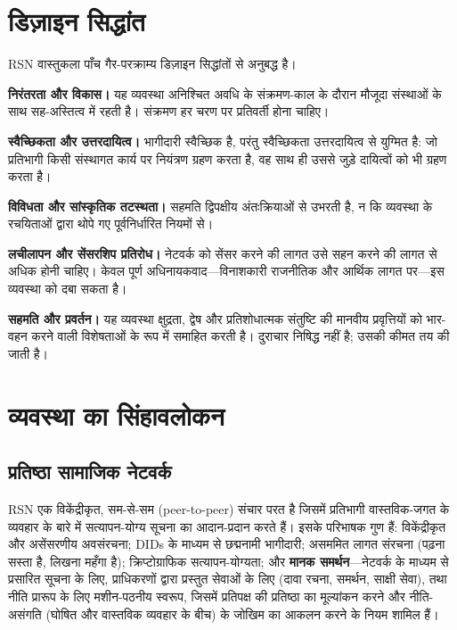 \documentclass[11pt,a4paper,twocolumn]{article}
\begin{document}
\section{डिज़ाइन सिद्धांत}

RSN वास्तुकला पाँच गैर-परक्राम्य डिज़ाइन सिद्धांतों से अनुबद्ध है।

\textbf{निरंतरता और विकास।} यह व्यवस्था अनिश्चित अवधि के संक्रमण-काल के दौरान मौजूदा संस्थाओं के साथ सह-अस्तित्व में रहती है। संक्रमण हर चरण पर प्रतिवर्ती होना चाहिए।

\textbf{स्वैच्छिकता और उत्तरदायित्व।} भागीदारी स्वैच्छिक है, परंतु स्वैच्छिकता उत्तरदायित्व से युग्मित है: जो प्रतिभागी किसी संस्थागत कार्य पर नियंत्रण ग्रहण करता है, वह साथ ही उससे जुड़े दायित्वों को भी ग्रहण करता है।

\textbf{विविधता और सांस्कृतिक तटस्थता।} सहमति द्विपक्षीय अंतःक्रियाओं से उभरती है, न कि व्यवस्था के रचयिताओं द्वारा थोपे गए पूर्वनिर्धारित नियमों से।

\textbf{लचीलापन और सेंसरशिप प्रतिरोध।} नेटवर्क को सेंसर करने की लागत उसे सहन करने की लागत से अधिक होनी चाहिए। केवल पूर्ण अधिनायकवाद---विनाशकारी राजनीतिक और आर्थिक लागत पर---इस व्यवस्था को दबा सकता है।

\textbf{सहमति और प्रवर्तन।} यह व्यवस्था क्षुद्रता, द्वेष और प्रतिशोधात्मक संतुष्टि की मानवीय प्रवृत्तियों को भार-वहन करने वाली विशेषताओं के रूप में समाहित करती है। दुराचार निषिद्ध नहीं है; उसकी कीमत तय की जाती है।

\section{व्यवस्था का सिंहावलोकन}

\subsection{प्रतिष्ठा सामाजिक नेटवर्क}

RSN एक विकेंद्रीकृत, सम-से-सम (peer-to-peer) संचार परत है जिसमें प्रतिभागी वास्तविक-जगत के व्यवहार के बारे में सत्यापन-योग्य सूचना का आदान-प्रदान करते हैं। इसके परिभाषक गुण हैं: विकेंद्रीकृत और असेंसरणीय अवसंरचना; DIDs के माध्यम से छद्मनामी भागीदारी; असममित लागत संरचना (पढ़ना सस्ता है, लिखना महँगा है); क्रिप्टोग्राफिक सत्यापन-योग्यता; और \textbf{मानक समर्थन}---नेटवर्क के माध्यम से प्रसारित सूचना के लिए, प्राधिकरणों द्वारा प्रस्तुत सेवाओं के लिए (दावा रचना, समर्थन, साक्षी सेवा), तथा नीति प्रारूप के लिए मशीन-पठनीय स्वरूप, जिसमें प्रतिपक्ष की प्रतिष्ठा का मूल्यांकन करने और नीति-असंगति (घोषित और वास्तविक व्यवहार के बीच) के जोखिम का आकलन करने के नियम शामिल हैं।
\end{document}
